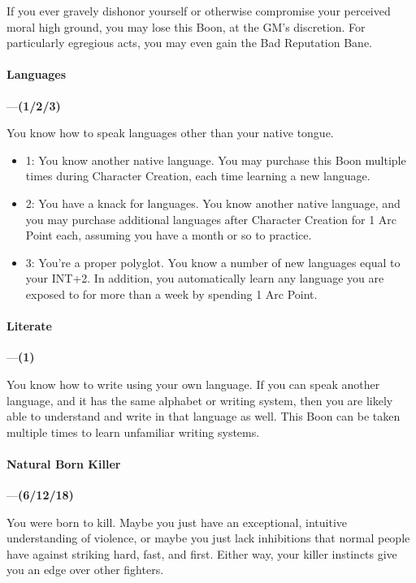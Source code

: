 \documentclass[oneside,11pt,english]{book}
\begin{document}
If you ever gravely dishonor yourself or otherwise compromise your perceived moral high ground, you 
may lose this Boon, at the GM's discretion. For particularly egregious acts, you may even gain the Bad 
Reputation Bane. 



\paragraph{\label{boon:Languages}Languages}---\quad\textbf{(1/2/3) }\par
You know how to speak languages other than your native tongue. 
\begin{itemize}
\item 1: You know another native language. You may purchase this Boon multiple times during Character 
Creation, each time learning a new language. 
\item 2: You have a knack for languages. You know another native language, and you may purchase additional 
languages after Character Creation for 1 Arc Point each, assuming you have a month or so to practice. 
\item 3: You're a proper polyglot. You know a number of new languages equal to your INT+2. In addition, you 
automatically learn any language you are exposed to for more than a week by spending 1 Arc Point. 
\end{itemize}
\paragraph{\label{boon:Literate}Literate}---\quad\textbf{(1) }\par
You know how to write using your own language. If you can speak another language, and it has the same 
alphabet or writing system, then you are likely able to understand and write in that language as well. This 
Boon can be taken multiple times to learn unfamiliar writing systems. 


\paragraph{\label{boon:Natural Born Killer}Natural Born Killer}---\quad\textbf{(6/12/18) }\par
You were born to kill. Maybe you just have an exceptional, intuitive understanding of violence, or maybe 
you just lack inhibitions that normal people have against striking hard, fast, and first. Either way, your 
killer instincts give you an edge over other fighters. 
\end{document}
